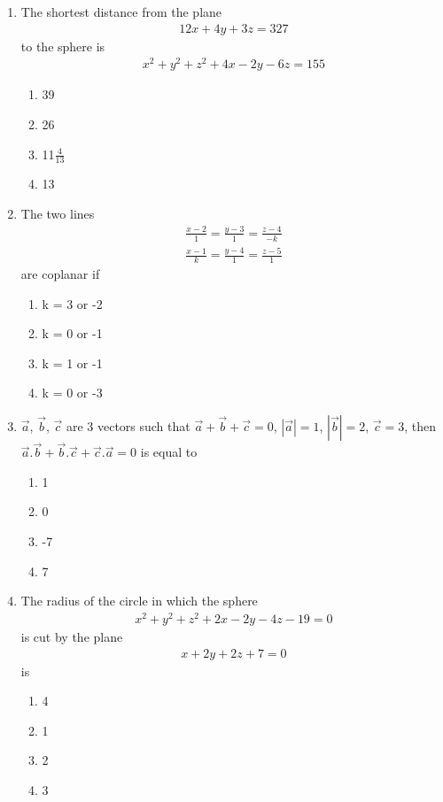 \begin{enumerate}[label=\arabic*.,ref=\thesubsection.\theenumi]
\item The shortest distance from the plane 
\begin{align}
12x + 4y + 3z = 327
\end{align}
to the sphere is
\begin{align}
x^{2} + y^{2} + z^{2} + 4x - 2y - 6z = 155
\end{align}
\begin{enumerate}
\item 39
\item 26
\item 11$\frac{4}{13}$
\item 13
\end{enumerate}

\item The two lines 
\begin{align*}
\frac{x-2}{1} = \frac{y-3}{1} = \frac{z-4}{-k}
\end{align*}
\begin{align*}
\frac{x-1}{k} = \frac{y-4}{1} = \frac{z-5}{1}
\end{align*}
are coplanar if
\begin{enumerate}
\item k = 3 or -2
\item k = 0 or -1
\item k = 1 or -1
\item k = 0 or -3
\end{enumerate}

\item $\overrightarrow{a}$, $\overrightarrow{b}$, $\overrightarrow{c}$ are 3 vectors such that 
$\overrightarrow{a}+\overrightarrow{b}+\overrightarrow{c}=0$, $|\overrightarrow{a}|=1$, $|\overrightarrow{b}|=2$, $\overrightarrow{c}=3$, then $\overrightarrow{a}.\overrightarrow{b}+\overrightarrow{b}.\overrightarrow{c}+\overrightarrow{c}.\overrightarrow{a}=0$ is equal to
\begin{enumerate}
\item 1
\item 0
\item -7
\item 7
\end{enumerate}

\item The radius of the circle in which the sphere
\begin{align}
x^2+y^2+z^2+2x-2y-4z-19=0 
\end{align}
is cut by the plane
\begin{align}
x+2y+2z+7=0
\end{align}
is
\begin{enumerate}
\item 4
\item 1
\item 2
\item 3
\end{enumerate}


\end{enumerate}
